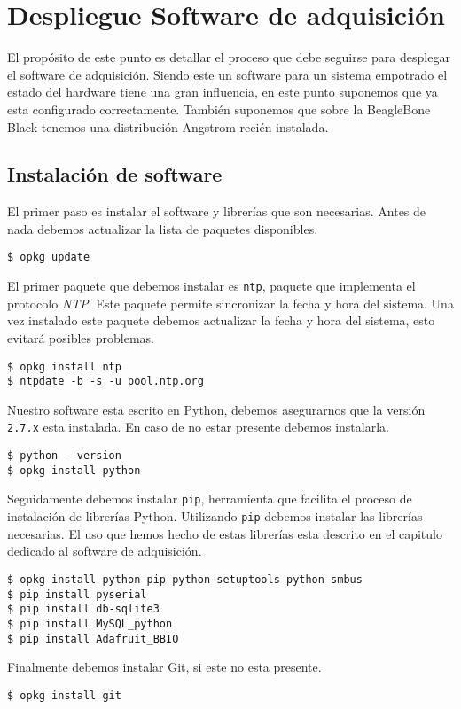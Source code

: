 \appendix

\chapter{Despliegue Software de adquisición}
	\label{app_soft}
	El propósito de este punto es detallar el proceso que debe seguirse para desplegar el software de adquisición. Siendo este un software para un
	sistema empotrado el estado del hardware tiene una gran influencia, en este punto suponemos que ya esta configurado correctamente. También
	suponemos que sobre la BeagleBone Black tenemos una distribución Angstrom recién instalada.
	\section{Instalación de software} 
		El primer paso es instalar el software y librerías que son necesarias. Antes de nada debemos actualizar la lista de paquetes
		disponibles. 
		\begin{lstlisting}[style=myBash]
$ opkg update
		\end{lstlisting}
		\par
		El primer paquete que debemos instalar es \texttt{ntp}, paquete que implementa el protocolo \emph{NTP}. Este paquete permite
		sincronizar la fecha y hora del sistema.  Una vez instalado este paquete debemos actualizar la fecha y hora del sistema, esto evitará
		posibles problemas.
		\begin{lstlisting}[style=myBash]
$ opkg install ntp
$ ntpdate -b -s -u pool.ntp.org
		\end{lstlisting}
		\par
		Nuestro software esta escrito en Python, debemos asegurarnos que la versión \texttt{2.7.x} esta instalada. En caso de no estar
		presente debemos instalarla.
		\begin{lstlisting}[style=myBash]
$ python --version
$ opkg install python
		\end{lstlisting}
		Seguidamente debemos instalar \texttt{pip}, herramienta que facilita el proceso de instalación de librerías Python.  Utilizando
		\texttt{pip} debemos instalar las librerías necesarias. El uso que hemos hecho de estas librerías esta descrito en el capitulo
		dedicado al software de adquisición.
		\begin{lstlisting}[style=myBash]
$ opkg install python-pip python-setuptools python-smbus
$ pip install pyserial
$ pip install db-sqlite3
$ pip install MySQL_python
$ pip install Adafruit_BBIO
		\end{lstlisting}
		\par
		Finalmente debemos instalar Git, si este no esta presente.
		\begin{lstlisting}[style=myBash]
$ opkg install git
		\end{lstlisting}
